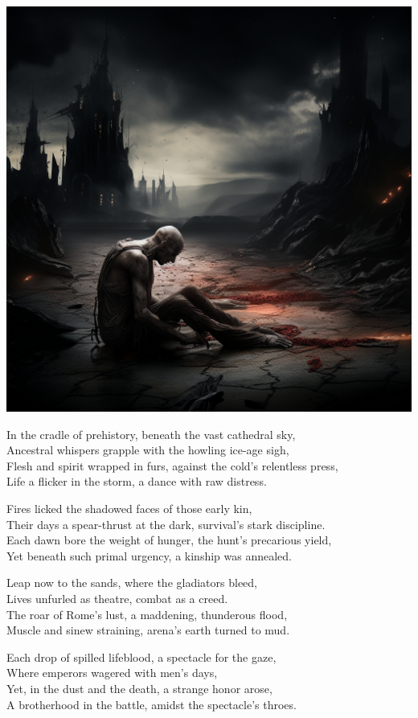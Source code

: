 \documentclass[10pt,letterpaper]{article}
\begin{document}
\pagestyle{empty} %

\begin{center}
\includegraphics[width=0.3\linewidth]{a_q_s_the_human_condition_suffering_pain_evolution_618e4ef6-60ba-4d7b-a48b-e12e2a8f11cf.png}

\bigskip

In the cradle of prehistory, beneath the vast cathedral sky, \\
Ancestral whispers grapple with the howling ice-age sigh,\\
Flesh and spirit wrapped in furs, against the cold's relentless press,\\
Life a flicker in the storm, a dance with raw distress.\\

\bigskip

Fires licked the shadowed faces of those early kin,\\
Their days a spear-thrust at the dark, survival's stark discipline.\\
Each dawn bore the weight of hunger, the hunt's precarious yield,\\
Yet beneath such primal urgency, a kinship was annealed.\\

\bigskip

Leap now to the sands, where the gladiators bleed,\\
Lives unfurled as theatre, combat as a creed.\\
The roar of Rome's lust, a maddening, thunderous flood,\\
Muscle and sinew straining, arena's earth turned to mud.\\

\bigskip

Each drop of spilled lifeblood, a spectacle for the gaze,\\
Where emperors wagered with men's days,\\
Yet, in the dust and the death, a strange honor arose,\\
A brotherhood in the battle, amidst the spectacle's throes.\\


\end{center}
\end{document}
